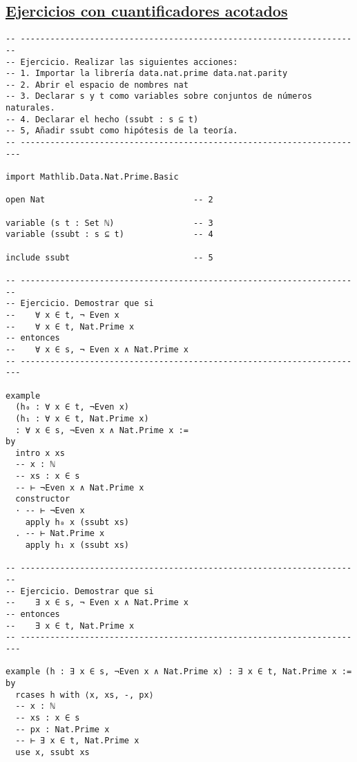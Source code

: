 \subsection{\href{./src/Conjuntos/Ejercicios\_con\_cuantificadores\_acotados.lean}{Ejercicios con cuantificadores acotados}}
\label{sec:org911095e}
\begin{verbatim}
-- ---------------------------------------------------------------------
-- Ejercicio. Realizar las siguientes acciones:
-- 1. Importar la librería data.nat.prime data.nat.parity
-- 2. Abrir el espacio de nombres nat
-- 3. Declarar s y t como variables sobre conjuntos de números naturales.
-- 4. Declarar el hecho (ssubt : s ⊆ t)
-- 5, Añadir ssubt como hipótesis de la teoría.
-- ----------------------------------------------------------------------

import Mathlib.Data.Nat.Prime.Basic

open Nat                              -- 2

variable (s t : Set ℕ)                -- 3
variable (ssubt : s ⊆ t)              -- 4

include ssubt                         -- 5

-- ---------------------------------------------------------------------
-- Ejercicio. Demostrar que si
--    ∀ x ∈ t, ¬ Even x
--    ∀ x ∈ t, Nat.Prime x
-- entonces
--    ∀ x ∈ s, ¬ Even x ∧ Nat.Prime x
-- ----------------------------------------------------------------------

example
  (h₀ : ∀ x ∈ t, ¬Even x)
  (h₁ : ∀ x ∈ t, Nat.Prime x)
  : ∀ x ∈ s, ¬Even x ∧ Nat.Prime x :=
by
  intro x xs
  -- x : ℕ
  -- xs : x ∈ s
  -- ⊢ ¬Even x ∧ Nat.Prime x
  constructor
  · -- ⊢ ¬Even x
    apply h₀ x (ssubt xs)
  . -- ⊢ Nat.Prime x
    apply h₁ x (ssubt xs)

-- ---------------------------------------------------------------------
-- Ejercicio. Demostrar que si
--    ∃ x ∈ s, ¬ Even x ∧ Nat.Prime x
-- entonces
--    ∃ x ∈ t, Nat.Prime x
-- ----------------------------------------------------------------------

example (h : ∃ x ∈ s, ¬Even x ∧ Nat.Prime x) : ∃ x ∈ t, Nat.Prime x :=
by
  rcases h with ⟨x, xs, -, px⟩
  -- x : ℕ
  -- xs : x ∈ s
  -- px : Nat.Prime x
  -- ⊢ ∃ x ∈ t, Nat.Prime x
  use x, ssubt xs
\end{verbatim}

